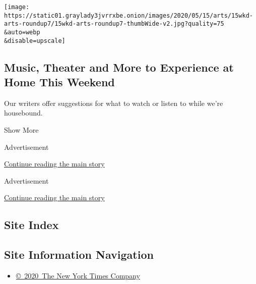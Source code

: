 \begin{enumerate}
  \texttt{[image: https://static01.graylady3jvrrxbe.onion/images/2020/05/15/arts/15wkd-arts-roundup7/15wkd-arts-roundup7-thumbWide-v2.jpg?quality=75\\\&auto=webp\\\&disable=upscale]}

  \hypertarget{music-theater-and-more-to-experience-at-home-this-weekend}{%
  \subsection{Music, Theater and More to Experience at Home This
  Weekend}\label{music-theater-and-more-to-experience-at-home-this-weekend}}

  Our writers offer suggestions for what to watch or listen to while
  we're housebound.
\end{enumerate}

Show More

Advertisement

\protect\hyperlink{after-mid1}{Continue reading the main story}

Advertisement

\protect\hyperlink{after-mktg}{Continue reading the main story}

\hypertarget{site-index}{%
\subsection{Site Index}\label{site-index}}

\hypertarget{site-information-navigation}{%
\subsection{Site Information
Navigation}\label{site-information-navigation}}

\begin{itemize}
\tightlist
\item
  \href{https://help.nytimes3xbfgragh.onion/hc/en-us/articles/115014792127-Copyright-notice}{©~2020~The
  New York Times Company}
\end{itemize}

